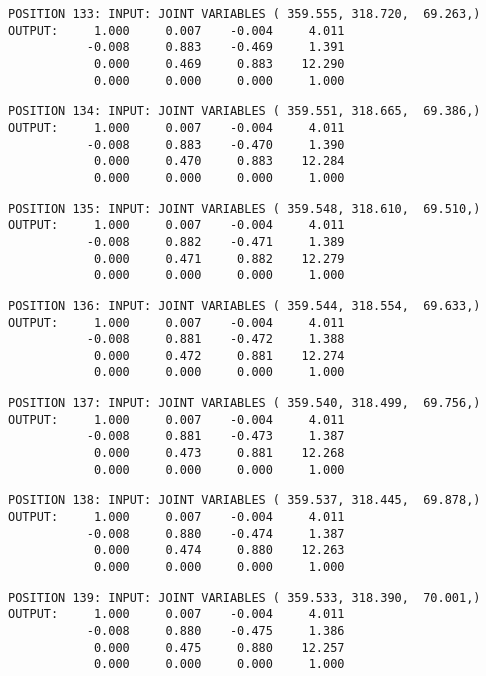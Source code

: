 \begin{verbatim}
POSITION 133: INPUT: JOINT VARIABLES ( 359.555, 318.720,  69.263,)
OUTPUT:     1.000     0.007    -0.004     4.011
           -0.008     0.883    -0.469     1.391
            0.000     0.469     0.883    12.290
            0.000     0.000     0.000     1.000
\end{verbatim} \pagebreak[1]\begin{verbatim}
POSITION 134: INPUT: JOINT VARIABLES ( 359.551, 318.665,  69.386,)
OUTPUT:     1.000     0.007    -0.004     4.011
           -0.008     0.883    -0.470     1.390
            0.000     0.470     0.883    12.284
            0.000     0.000     0.000     1.000
\end{verbatim} \pagebreak[1]\begin{verbatim}
POSITION 135: INPUT: JOINT VARIABLES ( 359.548, 318.610,  69.510,)
OUTPUT:     1.000     0.007    -0.004     4.011
           -0.008     0.882    -0.471     1.389
            0.000     0.471     0.882    12.279
            0.000     0.000     0.000     1.000
\end{verbatim} \pagebreak[1]\begin{verbatim}
POSITION 136: INPUT: JOINT VARIABLES ( 359.544, 318.554,  69.633,)
OUTPUT:     1.000     0.007    -0.004     4.011
           -0.008     0.881    -0.472     1.388
            0.000     0.472     0.881    12.274
            0.000     0.000     0.000     1.000
\end{verbatim} \pagebreak[1]\begin{verbatim}
POSITION 137: INPUT: JOINT VARIABLES ( 359.540, 318.499,  69.756,)
OUTPUT:     1.000     0.007    -0.004     4.011
           -0.008     0.881    -0.473     1.387
            0.000     0.473     0.881    12.268
            0.000     0.000     0.000     1.000
\end{verbatim} \pagebreak[1]\begin{verbatim}
POSITION 138: INPUT: JOINT VARIABLES ( 359.537, 318.445,  69.878,)
OUTPUT:     1.000     0.007    -0.004     4.011
           -0.008     0.880    -0.474     1.387
            0.000     0.474     0.880    12.263
            0.000     0.000     0.000     1.000
\end{verbatim} \pagebreak[1]\begin{verbatim}
POSITION 139: INPUT: JOINT VARIABLES ( 359.533, 318.390,  70.001,)
OUTPUT:     1.000     0.007    -0.004     4.011
           -0.008     0.880    -0.475     1.386
            0.000     0.475     0.880    12.257
            0.000     0.000     0.000     1.000
\end{verbatim} \pagebreak[1]\begin{verbatim}

\end{verbatim}
